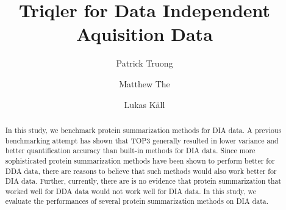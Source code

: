 \documentclass[10pt,letterpaper]{article}
\title{Triqler for Data Independent Aquisition Data}
\author{Patrick Truong \and Matthew The \and Lukas K\"{a}ll}
\begin{document}
\maketitle

\begin{abstract}
  
  In this study, we benchmark protein summarization methods for DIA data. A previous benchmarking attempt has shown that TOP3 generally resulted in lower variance and better quantification accuracy than built-in methods for DIA data. Since more sophisticated protein summarization methods have been shown to perform better for DDA data, there are reasons to believe that such methods would also work better for DIA data. Further, currently, there are is no evidence that protein summarization that worked well for DDA data would not work well for DIA data. In this study, we evaluate the performances of several protein summarization methods on DIA data. 
\end{abstract}
  
\end{document}
